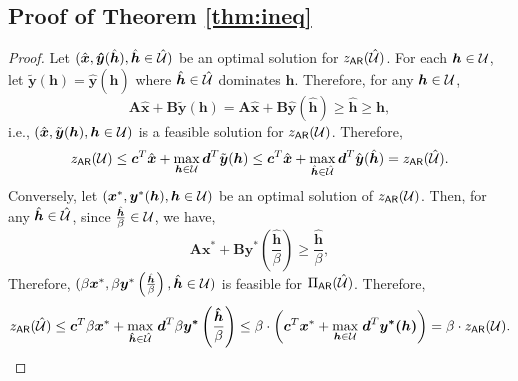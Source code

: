 \documentclass[11pt]{article}
\theoremstyle{plain}
\theoremstyle{definition}
\numberwithin{equation}{section}%
\numberwithin{equation}{section}%
\newcommand{\mb}[1]{\ensuremath{\boldsymbol{#1}}}
\begin{document}
\appendix
\begin{appendix}
\section{Proof of Theorem \ref{thm:ineq}}\label{apx-proofs:thm:ineq}



\begin{proof}
Let $(\hat{\mb{x}},\mb{\hat{y}}(\hat{\mb{h}}), \hat{\mb{h}}\in\hat{\cal U})$ be an optimal solution for $z_{\sf AR}(\hat{\cal U})$. For each $\mb{h}\in{\cal U}$, let $\tilde{\mb{y}}(\mb{h})= \hat{\mb{y}}(\hat{\mb{h}})$ where $\hat{\mb{h}}\in\hat{\cal U}$ dominates $\mb{h}$. Therefore, for any $\mb{h}\in{\cal U}$,
\[\mb{A}\hat{\mb{x}}+\mb{B}\tilde{\mb{y}}(\mb{h}) = \mb{A}\hat{\mb{x}}+\mb{B}\hat{\mb{y}}(\hat{\mb{h}})\geq\hat{\mb{h}}\geq\mb{h},\]
i.e.,  $(\hat{\mb{x}},\tilde{\mb{y}}(\mb{h}),\mb{h}\in{\cal U})$ is a feasible solution for $z_{\sf{AR}}({\cal U})$. Therefore,
\[z_{\sf AR}({\cal U})\leq\mb{c}^T\hat{\mb{x}}+\max_{\mb{h}\in{\cal U}}\mb{d}^T\tilde{\mb{y}}(\mb{h})\leq\mb{c}^T\hat{\mb{x}}+\max_{\hat{\mb{h}}\in\hat{\cal U}}\mb{d}^T\hat{\mb{y}}(\hat{\mb{h}})=z_{\sf{AR}}(\hat{\cal U}).\]
Conversely, let $(\mb{x}^*, \mb{y}^*(\mb{h}), \mb{h}\in{\cal U})$ be an optimal solution of $z_{\sf AR}({\cal U})$. Then, for any $\hat{\mb{h}}\in\hat{\cal U}$, since $ \frac{\hat{\mb{h}}}{\beta} \in{\cal U}$, we have,
\[\mb{A}\mb{x}^*+\mb{B}\mb{y}^*\left(\frac{\hat{\mb{h}}}{\beta}\right)\geq\frac{\hat{\mb{h}}}{\beta},\]
Therefore, $(\beta\mb{x}^*, \beta\mb{y}^*\left(\frac{\hat{\mb{h}}}{\beta}\right), \hat{\mb{h}} \in {\cal U})$ is feasible for $\Pi_{\sf AR}(\hat{\cal U})$. Therefore,
\[z_{\sf AR}(\hat{\cal U})\leq  \mb c^T  \beta  \mb x^* + \underset{ \mb{\hat{h}} \in \hat{\cal U}} \max \; \mb d^T   \beta  \mb{y^*}\left(\frac{\mb{\hat{h}}}{\beta}\right) \leq \beta \cdot \left( \mb c^T   \mb x^* + \underset{ \mb{h} \in {\cal U}} \max \; \mb d^T    \mb{y^*(h)} \right) = \beta \cdot z_{\sf{AR}}(\cal U).\]
 \end{proof}


\end{appendix}
\end{document}
